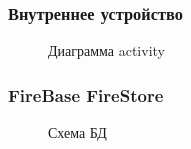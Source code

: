 \documentclass[xetex,mathserif,serif, xcolor=table]{beamer}
\begin{document}
	\begin{frame}
		\frametitle{Внутреннее устройство}
		\begin{figure}[h]
            \caption{Диаграмма activity}
            \label{fig:image}
        \end{figure}
	\end{frame}	
	
	\begin{frame}
		\frametitle{FireBase FireStore}
		\begin{figure}[h]
            \caption{Схема БД}
            \label{fig:image}
        \end{figure}
	\end{frame}	
	
\end{document}
